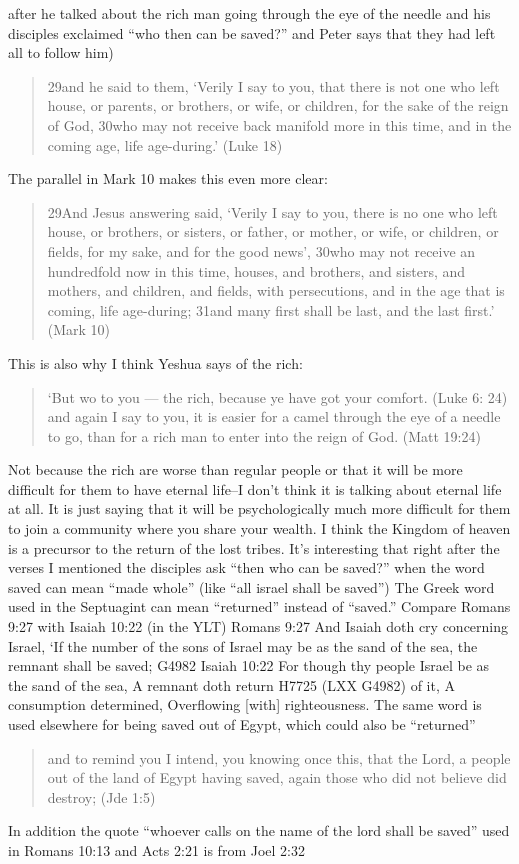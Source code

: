 \documentclass[11pt]{article}
\begin{document}
after he talked about the rich man going through the eye of the needle
and his disciples exclaimed “who then can be saved?” and Peter says
that they had left all to follow him)
\begin{quote}
29and he said to them, ‘Verily I say to you, that there is not one who left house, or parents, or brothers, or wife, or children, for the sake of the reign of God, 30who may not receive back manifold more in this time, and in the coming age, life age-during.’ (Luke 18)
\end{quote}
The parallel in Mark 10 makes this even more clear:
\begin{quote}
29And Jesus answering said, ‘Verily I say to you, there is no one who left house, or brothers, or sisters, or father, or mother, or wife, or children, or fields, for my sake, and for the good news’, 30who may not receive an hundredfold now in this time, houses, and brothers, and sisters, and mothers, and children, and fields, with persecutions, and in the age that is coming, life age-during; 31and many first shall be last, and the last first.’ (Mark 10)
\end{quote}
This is also why I think Yeshua says of the rich:
\begin{quote}
‘But wo to you — the rich, because ye have got your comfort. (Luke 6: 24)
and again I say to you, it is easier for a camel through the eye of a needle to go, than for a rich man to enter into the reign of God. (Matt 19:24)
\end{quote}
Not because the rich are worse than regular people or that it will be
more difficult for them to have eternal life–I don’t think it is
talking about eternal life at all. It is just saying that it will be
psychologically much more difficult for them to join a community where
you share your wealth.
I think the Kingdom of heaven is a precursor to the return of the lost
tribes. It’s interesting that right after the verses I mentioned the
disciples ask “then who can be saved?” when the word saved can mean
“made whole” (like “all israel shall be saved”)
The Greek word used in the Septuagint can mean “returned” instead of “saved.”
Compare Romans 9:27 with Isaiah 10:22 (in the YLT)
Romans 9:27 And Isaiah doth cry concerning Israel, `If the number of the sons of Israel may be as the sand of the sea, the remnant shall be saved; G4982
Isaiah 10:22 For though thy people Israel be as the sand of the sea, A remnant doth return H7725 (LXX G4982) of it, A consumption determined, Overflowing [with] righteousness. The same word is used elsewhere for being saved out of Egypt, which could also be “returned”
\begin{quote}
and to remind you I intend, you knowing once this, that the Lord, a people out of the land of Egypt having saved, again those who did not believe did destroy; (Jde 1:5)
\end{quote}
In addition the quote “whoever calls on the name of the lord shall be saved” used in Romans 10:13 and Acts 2:21 is from Joel 2:32
\end{document}
